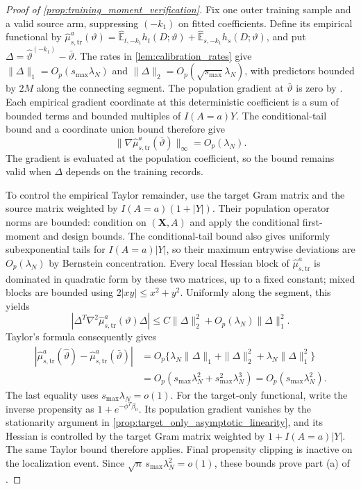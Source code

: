 \documentclass[12pt]{article}
\providecommand{\En}{\widehat{\mathbb E}}
\begin{document}
\begin{proof}[Proof of \cref{prop:training_moment_verification}]
Fix one outer training sample and a valid source arm, suppressing $(-k_1)$ on fitted coefficients. Define its empirical functional by $\widehat\mu_{s,\mathrm{tr}}^a(\vartheta)=\En_{t,-k_1}h_t(D;\vartheta)+\En_{s,-k_1}h_s(D;\vartheta)$, and put $\Delta=\widehat\vartheta^{(-k_1)}-\bar\vartheta$. The rates in \cref{lem:calibration_rates} give $\|\Delta\|_1=O_p(s_{\max}\lambda_N)$ and $\|\Delta\|_2=O_p(\sqrt{s_{\max}}\lambda_N)$, with predictors bounded by $2M$ along the connecting segment. The population gradient at $\bar\vartheta$ is zero by . Each empirical gradient coordinate at this deterministic coefficient is a sum of bounded terms and bounded multiples of $I(A=a)Y$. The conditional-tail bound and a coordinate union bound therefore give
\[
\|\nabla\widehat\mu_{s,\mathrm{tr}}^a(\bar\vartheta)\|_\infty=O_p(\lambda_N).
\]
The gradient is evaluated at the population coefficient, so the bound remains valid when $\Delta$ depends on the training records.

To control the empirical Taylor remainder, use the target Gram matrix and the source matrix weighted by $I(A=a)(1+|Y|)$. Their population operator norms are bounded: condition on $(\boldsymbol X,A)$ and apply the conditional first-moment and design bounds. The conditional-tail bound also gives uniformly subexponential tails for $I(A=a)|Y|$, so their maximum entrywise deviations are $O_p(\lambda_N)$ by Bernstein concentration. Every local Hessian block of $\widehat\mu_{s,\mathrm{tr}}^a$ is dominated in quadratic form by these two matrices, up to a fixed constant; mixed blocks are bounded using $2|xy|\le x^2+y^2$. Uniformly along the segment, this yields
\[
|\Delta^T\nabla^2\widehat\mu_{s,\mathrm{tr}}^a(\vartheta)\Delta|
\le C\|\Delta\|_2^2+O_p(\lambda_N)\|\Delta\|_1^2.
\]
Taylor's formula consequently gives
\[
\begin{aligned}
|\widehat\mu_{s,\mathrm{tr}}^a(\widehat\vartheta)-\widehat\mu_{s,\mathrm{tr}}^a(\bar\vartheta)|
&=O_p\{\lambda_N\|\Delta\|_1+\|\Delta\|_2^2
                +\lambda_N\|\Delta\|_1^2\}\\
&=O_p(s_{\max}\lambda_N^2+s_{\max}^2\lambda_N^3)
 =O_p(s_{\max}\lambda_N^2).
\end{aligned}
\]
The last equality uses $s_{\max}\lambda_N=o(1)$. For the target-only functional, write the inverse propensity as $1+e^{-\phi^T\beta_0}$. Its population gradient vanishes by the stationarity argument in \cref{prop:target_only_asymptotic_linearity}, and its Hessian is controlled by the target Gram matrix weighted by $1+I(A=a)|Y|$. The same Taylor bound therefore applies. Final propensity clipping is inactive on the localization event. Since $\sqrt n\,s_{\max}\lambda_N^2=o(1)$, these bounds prove part (a) of .


\end{proof}
\end{document}
